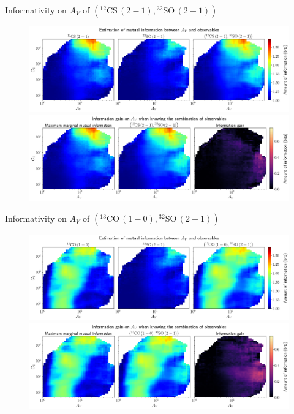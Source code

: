 \documentclass{beamer}
\begin{document}
\begin{frame}{Informativity on $A_V$ of $\left(\mathrm{^{12}CS\,(2-1)},\mathrm{^{32}SO\,(2-1)}\right)$}
    \begin{figure}
        \centering
        \includegraphics[width=0.95\linewidth]{../mi/av__12cs21_32so21_mi.png}
        \vfill
        \includegraphics[width=0.95\linewidth]{../mi/av__12cs21_32so21_mi_gain.png}
    \end{figure}
\end{frame}

\begin{frame}{Informativity on $A_V$ of $\left(\mathrm{^{13}CO\,(1-0)},\mathrm{^{32}SO\,(2-1)}\right)$}
    \begin{figure}
        \centering
        \includegraphics[width=0.95\linewidth]{../mi/av__13co10_32so21_mi.png}
        \vfill
        \includegraphics[width=0.95\linewidth]{../mi/av__13co10_32so21_mi_gain.png}
    \end{figure}
\end{frame}
\end{document}

